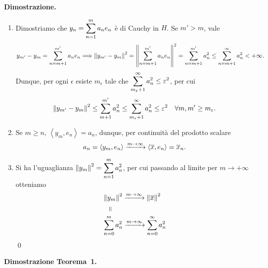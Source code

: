\textbf{Dimostrazione.}
\begin{enumerate}
\item Dimostriamo che $\displaystyle y_n = \sum_{n = 1}^{m} a_n e_n$ è di Cauchy in $H$.
Se $m' > m$, vale
%
$$
	y_{m'} - y_m = \sum_{n = m+1}^{m'} a_n e_n
	\Longrightarrow  \left\lVert y_{m'} - y_m \right\rVert^2 = \left\lVert \sum_{n = m+1}^{m'} a_n e_n \right\rVert^2 
	= \sum_{n = m+1}^{m'} a_n^2 \leq \sum_{n = m+1}^{\infty} a_n^2 < +\infty.
$$
%
Dunque, per ogni $\epsilon$ esiste $m_\epsilon$ tale che $\displaystyle \sum_{m_\varepsilon + 1}^{\infty} a_n^2 \leq \varepsilon^2 $, per cui 
%
$$
	\left\lVert y_{m'} - y_m \right\rVert^2 \leq \sum_{m+1}^{m'} a_n^2 \leq \sum_{m_\varepsilon + 1}^{\infty} a_n^2 \leq \varepsilon^2 \quad \forall m,m' \geq m_\varepsilon.
$$
%

\item Se $m \geq n$, $\left<y_m, e_n \right> = a_n$, dunque, per continuità del prodotto scalare
%
$$
	a_n = \left<y_m, e_n \right> \xrightarrow{m \to \infty} \left<\overline{x},e_n \right> = \overline{x}_n.
$$
%

\item Si ha l'uguaglianza $\displaystyle \left\lVert y_m \right\rVert^2 = \sum_{n=1}^{m} a_n^2$, per cui passando al limite per $m \to +\infty$ otteniamo 
\begin{align*}
	& \norm{y_m}^2 \xrightarrow{m \to \infty} \norm{\ol{x}}^2 \\
	& \quad \rotatebox[origin=c]{90}{=} \\
	& \sum_{n=0}^{m} a_n^2 \xrightarrow{m \to \infty} \sum_{n=0}^{\infty} a_n^2 
\end{align*}
\qed

\end{enumerate}


\textbf{Dimostrazione Teorema~1.}

